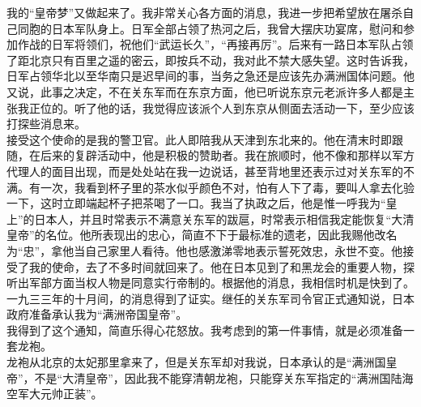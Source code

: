 我的“皇帝梦”又做起来了。我非常关心各方面的消息，我进一步把希望放在屠杀自己同胞的日本军队身上。日军全部占领了热河之后，我曾大摆庆功宴席，慰问和参加作战的日军将领们，祝他们“武运长久”，“再接再厉”。后来有一路日本军队占领了距北京只有百里之遥的密云，即按兵不动，我对此不禁大感失望。这时告诉我，日军占领华北以至华南只是迟早间的事，当务之急还是应该先办满洲国体问题。他又说，此事之决定，不在关东军而在东京方面，他已听说东京元老派许多人都是主张我正位的。听了他的话，我觉得应该派个人到东京从侧面去活动一下，至少应该打探些消息来。\\

接受这个使命的是我的警卫官。此人即陪我从天津到东北来的。他在清末时即跟随，在后来的复辟活动中，他是积极的赞助者。我在旅顺时，他不像和那样以军方代理人的面目出现，而是处处站在我一边说话，甚至背地里还表示过对关东军的不满。有一次，我看到杯子里的茶水似乎颜色不对，怕有人下了毒，要叫人拿去化验一下，这时立即端起杯子把茶喝了一口。我当了执政之后，他是惟一呼我为“皇上”的日本人，并且时常表示不满意关东军的跋扈，时常表示相信我定能恢复“大清皇帝”的名位。他所表现出的忠心，简直不下于最标准的遗老，因此我赐他改名为“忠”，拿他当自己家里人看待。他也感激涕零地表示誓死效忠，永世不变。他接受了我的使命，去了不多时间就回来了。他在日本见到了和黑龙会的重要人物，探听出军部方面当权人物是同意实行帝制的。根据他的消息，我相信时机是快到了。\\

一九三三年的十月间，的消息得到了证实。继任的关东军司令官正式通知说，日本政府准备承认我为“满洲帝国皇帝”。\\

我得到了这个通知，简直乐得心花怒放。我考虑到的第一件事情，就是必须准备一套龙袍。\\

龙袍从北京的太妃那里拿来了，但是关东军却对我说，日本承认的是“满洲国皇帝”，不是“大清皇帝”，因此我不能穿清朝龙袍，只能穿关东军指定的“满洲国陆海空军大元帅正装”。\\

